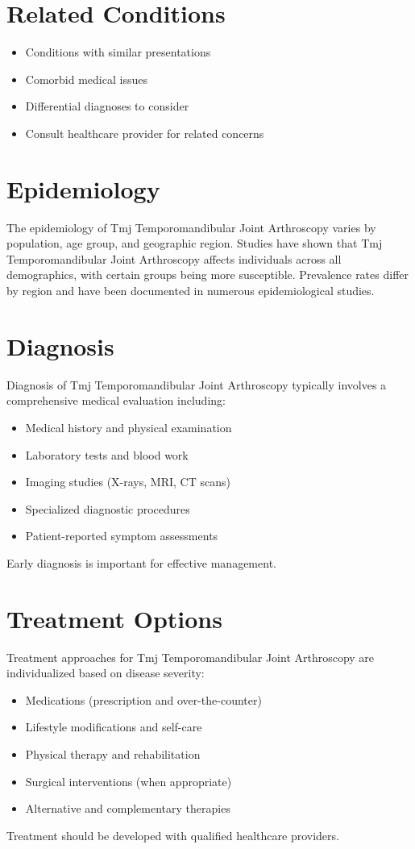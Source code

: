 \section*{Related Conditions}
\begin{itemize}
  \item Conditions with similar presentations
  \item Comorbid medical issues
  \item Differential diagnoses to consider
  \item Consult healthcare provider for related concerns
\end{itemize}

\section*{Epidemiology}
The epidemiology of Tmj Temporomandibular Joint Arthroscopy varies by population, age group, and geographic region. Studies have shown that Tmj Temporomandibular Joint Arthroscopy affects individuals across all demographics, with certain groups being more susceptible. Prevalence rates differ by region and have been documented in numerous epidemiological studies.

\section*{Diagnosis}
Diagnosis of Tmj Temporomandibular Joint Arthroscopy typically involves a comprehensive medical evaluation including:
\begin{itemize}
  \item Medical history and physical examination
  \item Laboratory tests and blood work
  \item Imaging studies (X-rays, MRI, CT scans)
  \item Specialized diagnostic procedures
  \item Patient-reported symptom assessments
\end{itemize}
Early diagnosis is important for effective management.

\section*{Treatment Options}
Treatment approaches for Tmj Temporomandibular Joint Arthroscopy are individualized based on disease severity:
\begin{itemize}
  \item Medications (prescription and over-the-counter)
  \item Lifestyle modifications and self-care
  \item Physical therapy and rehabilitation
  \item Surgical interventions (when appropriate)
  \item Alternative and complementary therapies
\end{itemize}
Treatment should be developed with qualified healthcare providers.

